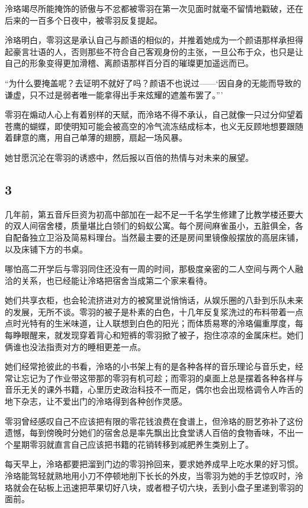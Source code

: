 \documentclass[UTF8, scheme = chinese, openany]{ctexbook}
\begin{document}
泠珞竭尽所能掩饰的骄傲与不忿都被零羽在第一次见面时就毫不留情地戳破，还在后来的一百多个日夜中，被零羽反复提起。

泠珞明白，零羽这是承认自己与颜语的相似的，并推着她成为一个颜语那样承担得起豪言壮语的人，否则那些不符合自己客观身份的主张，一旦公布于众，也只是让自己的形象变得更加滑稽、离颜语那样百分百的璀璨更加遥远而已。

“为什么要掩盖呢？去证明不就好了吗？颜语不也说过——‘因自身的无能而导致的谦虚，只不过是弱者唯一能拿得出手来炫耀的遮羞布罢了。”’

零羽在煽动人心上有着别样的天赋，而泠珞不得不承认，自己就像一只过分仰望着苍鹰的蝴蝶，即使明知可能会被高空的冷气流冻结成标本，也义无反顾地想要跟随着肆意的鹰，用自己单薄的翅膀，扇起一场风暴。

她甘愿沉沦在零羽的诱惑中，然后报以百倍的热情与对未来的展望。

\subsection{3}

几年前，第五音斥巨资为初高中部加在一起不足一千名学生修建了比教学楼还要大的双人间宿舍楼，质量堪比白领们的蚂蚁公寓。每个房间麻雀虽小，五脏俱全，各自配备独立卫浴及简易料理台。当然最主要的还是房间里镜像般摆放的高层床铺，以及床铺下方的书桌。

哪怕高二开学后与零羽同住还没有一周的时间，那极度亲密的二人空间与两个人融洽的关系，也已经能让泠珞把宿舍当成第二个家来看待。

她们共享衣柜，也会轮流挤进对方的被窝里说悄悄话，从娱乐圈的八卦到乐队未来的发展，无所不谈。零羽的被子是朴素的白色，十几年反复浆洗过的布料带着一点点时光特有的生米味道，让人联想到白色的阳光；而体质易寒的泠珞偏重厚度，每每睁眼醒来，就发现穿着背心和短裤的零羽掀了被子，抱住凉凉的金属床栏。她们俩谁也没法指责对方的睡相更差一点。

她们经常抢彼此的书看，泠珞的小书架上有的是各种各样的音乐理论与音乐史，经常让忘记为了作业带这带那的零羽有机可趁；而零羽的桌面上总是摆着各种各样与音乐无关的课外书籍，心里历史政治科技不一而足，偶尔也会出现格调令人咋舌的地下杂志，让不爱出门的泠珞得到各种创作灵感。

零羽曾经感叹自己不应该把有限的零花钱浪费在食谱上，但泠珞的厨艺弥补了这份遗憾，每到傍晚时分她们的宿舍总是率先飘出比食堂诱人百倍的食物香味，不出一个星期零羽就直言自己应该把书籍的花销转移到减肥养生类别上了。

每天早上，泠珞都要把溜到门边的零羽拎回来，要求她养成早上吃水果的好习惯。泠珞能驾轻就熟地用小刀不停顿地削下长长的外皮，当零羽为她的手艺惊叹时，泠珞就会在砧板上迅速把苹果切好八块，或者橙子切六块，丢到小盘子里递到零羽的面前。
\end{document}

